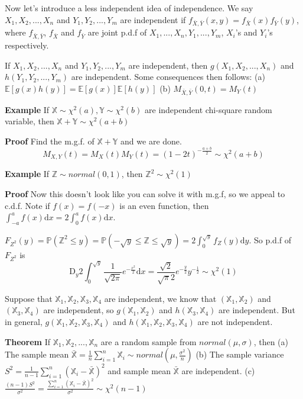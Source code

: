 \documentclass[a4paper,12pt]{article}
\begin{document}
Now let's introduce a less independent idea of independence. We say $X_1, X_2, ..., X_n$ and $Y_1, Y_2, ..., Y_m$ are
independent if $f_{\bar{X}, \bar{Y}}(x, y) = f_{\bar{X}}(x)f_{\bar{Y}}(y)$, where $f_{\bar{X}, \bar{Y}}$, $f_{\bar{X}}$ and $f_{\bar{Y}}$ are joint p.d.f of $X_1, ..., X_n, Y_1, ..., Y_m$, $X_i$'s and $Y_i$'s respectively. 

If $X_1, X_2, ..., X_n$ and $Y_1, Y_2, ..., Y_m$ are independent, then $g(X_1, X_2, ..., X_n)$ and $h(Y_1, Y_2, ..., Y_m)$ are independent. Some consequences then follows: 
(a) $\mathbb{E}[g(x)h(y)] = \mathbb{E}[g(x)]\mathbb{E}[h(y)]$ 
(b) $M_{\bar{X}, \bar{Y}}( 0, t ) = M_Y(t)$ 

\textbf{Example} If $\mathbb{X} \sim \chi^2(a), \mathbb{Y} \sim \chi^2(b)$ are independent chi-square random variable, then $\mathbb{X}+\mathbb{Y} \sim \chi^2(a+b)$ 

\textbf{Proof} Find the m.g.f. of $\mathbb{X}+\mathbb{Y}$ and we are done.
$$M_{X, Y}(t) = M_X(t)M_Y(t) = (1-2t)^{-\frac{a+b}{2}} \sim \chi^2(a+b)$$ 

\textbf{Example} If $\mathbb{Z} \sim normal(0, 1)$, then $\mathbb{Z}^2 \sim \chi^2(1)$ 

\textbf{Proof} Now this doesn't look like you can solve it with m.g.f, so we appeal to c.d.f. Note if $f(x) = f(-x)$ is an even function, then $\int_{-a}^a f(x) \mathrm{d}x = 2\int_0^a f(x) \mathrm{d}x$. 

$F_{Z^2}(y) = \mathbb{P}(\mathbb{Z}^2 \leq y ) = \mathbb{P}(-\sqrt{y} \leq \mathbb{Z} \leq \sqrt{y} ) = 2 \int_0^{\sqrt{y}} f_Z(y) \mathrm{d}y$. 
So p.d.f of $F_{Z^2}$ is 
$$\mathrm{D}_y 2\int_0^{\sqrt{y}} \frac{1}{\sqrt{2\pi}} e^{-\frac{x^2}{2}} \mathrm{d}x = \frac{\sqrt{2}}{\sqrt{\pi}2} e^{-\frac{y}{2}} y^{-\frac{1}{2}} \sim \chi^2(1)$$ 

Suppose that $\mathbb{X}_1, \mathbb{X}_2, \mathbb{X}_3, \mathbb{X}_4$ are independent, we know that $(\mathbb{X}_1, \mathbb{X}_2)$ and $(\mathbb{X}_3, \mathbb{X}_4)$ are independent, so $g(\mathbb{X}_1, \mathbb{X}_2)$ and $h(\mathbb{X}_3, \mathbb{X}_4)$ are independent. But in general, $g(\mathbb{X}_1, \mathbb{X}_2, \mathbb{X}_3, \mathbb{X}_4)$ and $h(\mathbb{X}_1, \mathbb{X}_2, \mathbb{X}_3, \mathbb{X}_4)$ are not independent. 

\textbf{Theorem} If $\mathbb{X}_1, \mathbb{X}_2, ..., \mathbb{X}_n$ are a random sample from $normal(\mu, \sigma)$, then 
(a) The sample mean $\bar{\mathbb{X}} = \frac{1}{n}\sum_{i=1}^n\mathbb{X}_i \sim normal(\mu, \frac{\sigma^2}{n})$ 
(b) The sample variance $S^2 = \frac{1}{n-1} \sum_{i=1}^n (\mathbb{X}_i-\bar{\mathbb{X}})^2$ and sample mean $\bar{\mathbb{X}}$ are independent. 
(c) $\frac{(n-1)S^2}{\sigma^2} = \frac{\sum_{i=1}^n (\mathbb{X}_i-\bar{\mathbb{X}})^2}{\sigma^2} \sim \chi^2(n-1)$ 
\end{document}
